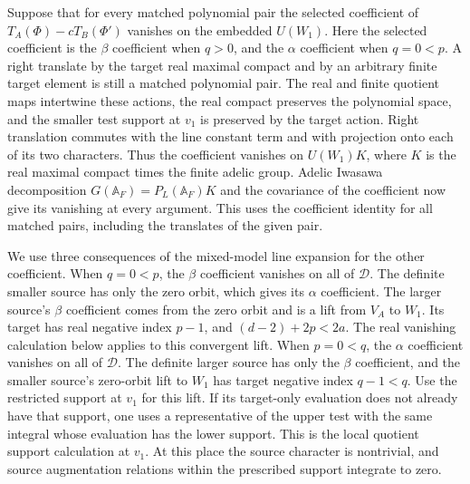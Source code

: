 Suppose that for every matched polynomial pair the selected coefficient
of \(T_A(\Phi)-cT_B(\Phi')\) vanishes on the embedded \(U(W_1)\).
Here the selected coefficient is the \(\beta\) coefficient when
\(q>0\), and the \(\alpha\) coefficient when \(q=0<p\). A right
translate by the target real maximal compact and by an arbitrary
finite target element is still a matched polynomial pair. The real
and finite quotient maps intertwine these actions, the real compact
preserves the polynomial space, and the smaller test support at
\(v_1\) is preserved by the target action. Right translation commutes
with the line constant term and with projection onto each of its two
characters. Thus the coefficient vanishes on \(U(W_1)K\), where
\(K\) is the real maximal compact times the finite adelic group.
Adelic Iwasawa decomposition \(G(\mathbb A_F)=P_L(\mathbb A_F)K\)
and the covariance of the coefficient now give its vanishing at every
argument. This uses the coefficient identity for all matched pairs,
including the translates of the given pair.

We use three consequences of the mixed-model line expansion for the
other coefficient. When \(q=0<p\), the \(\beta\) coefficient
vanishes on all of \(\mathscr D\). The definite smaller source has
only the zero orbit, which gives its \(\alpha\) coefficient. The
larger source's \(\beta\) coefficient comes from the zero orbit and
is a lift from \(V_A\) to \(W_1\). Its target has real negative index
\(p-1\), and \((d-2)+2p<2a\). The real vanishing calculation below
applies to this convergent lift. When \(p=0<q\), the \(\alpha\)
coefficient vanishes on all of \(\mathscr D\). The definite larger
source has only the \(\beta\) coefficient, and the smaller source's
zero-orbit lift to \(W_1\) has target negative index \(q-1<q\).
Use the restricted support at \(v_1\) for this lift. If its target-only
evaluation does not already have that support, one uses a representative
of the upper test with the same integral whose evaluation has the
lower support. This is the local quotient support calculation at
\(v_1\). At this place the source character is nontrivial, and source
augmentation relations within the prescribed support integrate to zero.

